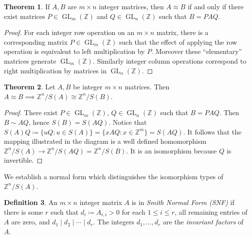 \documentclass[12pt,a4paper,answers]{exam}
\newcommand{\Z}{\mathbb{Z}}
\DeclareMathOperator{\GL}{GL}
\theoremstyle{definition}
\newtheorem{theorem}{Theorem}[section]
\newtheorem{definition}[theorem]{Definition}
\begin{document}
\begin{theorem}
  If $A,B$ are $m\times n$ integer matrices, then $A\approx B$ if and only if there exist matrices $P\in\GL_m(\Z)$ and $Q\in\GL_n(\Z)$ such that $B=PAQ$.
\end{theorem}

\begin{proof}
  For each integer row operation on an $m\times n$ matrix, there is a corresponding matrix $P\in\GL_m(\Z)$ such that the effect of applying the row operation is equivalent to left multiplication by $P$. Moreover these ``elementary'' matrices generate $\GL_m(\Z)$. Similarly integer column operations correspond to right multiplication by matrices in $\GL_n(\Z)$.
\end{proof}

\begin{theorem}
  \label{commutative-diagram}
  Let $A,B$ be integer $m\times n$ matrices. Then $A\approx B\implies \Z^n/S(A)\cong\Z^n/S(B)$.
\end{theorem}

\begin{proof}
  There exist $P\in\GL_m(\Z)$, $Q\in\GL_n(\Z)$ such that $B=PAQ$. Then $B\sim AQ$, hence $S(B)=S(AQ)$. Notice that $S(A)Q\coloneqq\{uQ : u\in S(A)\}=\{xAQ : x\in\Z^m\}=S(AQ)$. It follows that the mapping illustrated in the diagram is a well defined homomorphism $\Z^n/S(A)\to\Z^n/S(AQ)=\Z^n/S(B)$. It is an isomorphism because $Q$ is invertible.

  \centering

\end{proof}

We establish a normal form which distinguishes the isomorphism types of $\Z^n/S(A)$.

\begin{definition}
  An $m\times n$ integer matrix $A$ is in \emph{Smith Normal Form (SNF)} if there is some $r$ such that $d_i\coloneqq A_{i,i}>0$ for each $1\leq i\leq r$, all remaining entries of $A$ are zero, and $d_1\mid d_2\mid \cdots \mid d_r$. The integers $d_1,\ldots,d_r$ are the \emph{invariant factors} of $A$.
\end{definition}
\end{document}
